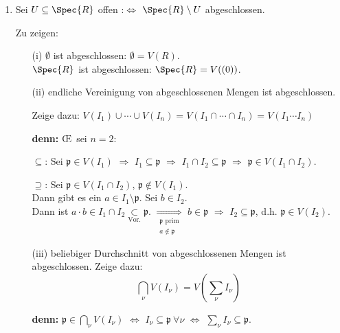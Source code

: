 \begin{Bew}
\begin{enumerate}
\item Sei $U \subseteq \Spec{R}$ offen :$\Leftrightarrow$ $\Spec{R} \setminus U$
abgeschlossen.

Zu zeigen:
\begin{enumerate}
\item[(i)] $\emptyset$ ist abgeschlossen: $\emptyset = V(R)$.\\
$\Spec{R}$ ist abgeschlossen: $\Spec{R} = V( (0) )$.

\item[(ii)] endliche Vereinigung von abgeschlossenen Mengen ist abgeschlossen.

Zeige dazu: $V(I_1) \cup \cdots \cup V(I_n) = V(I_1 \cap \cdots \cap I_n) = V(I_1 \cdots I_n)$

\textbf{denn:} \OE\ sei $n=2$:

\glqq$\subseteq$\grqq: Sei $\mathfrak{p} \in V(I_1)$ $\Rightarrow$ $I_1 \subseteq \mathfrak{p}$ $\Rightarrow$ $I_1 \cap I_2 \subseteq \mathfrak{p}$ $\Rightarrow$ $\mathfrak{p} \in V(I_1 \cap I_2)$.

\glqq$\supseteq$\grqq: Sei $\mathfrak{p} \in V(I_1 \cap I_2)$, $\mathfrak{p} \not\in V(I_1)$.\\
Dann gibt es ein $a \in I_1 \setminus \mathfrak{p}$. Sei $b \in I_2$.\\
Dann ist $a \cdot b \in I_1 \cap I_2 \underset{\text{Vor.}}{\subset} \mathfrak{p}$. $\underset{\substack{\mathfrak{p}\text{ prim} \\ a \notin \mathfrak{p}}}{\Rightarrow}$ $b \in \mathfrak{p}$ $\Rightarrow$ $I_2 \subseteq \mathfrak{p}$, d.h. $\mathfrak{p} \in V(I_2)$.

\item[(iii)] beliebiger Durchschnitt von abgeschlossenen Mengen ist abgeschlossen. Zeige dazu:
$$\bigcap_\nu V(I_\nu) = V\left(\sum_\nu I_\nu\right)$$

\textbf{denn:} $\mathfrak{p} \in \bigcap_\nu V(I_\nu)$ $\Leftrightarrow$ $I_\nu \subseteq \mathfrak{p}\ \forall \nu$ $\Leftrightarrow$ $\sum_\nu I_\nu \subseteq \mathfrak{p}$.

\end{enumerate}
\end{enumerate} 

\end{Bew}



